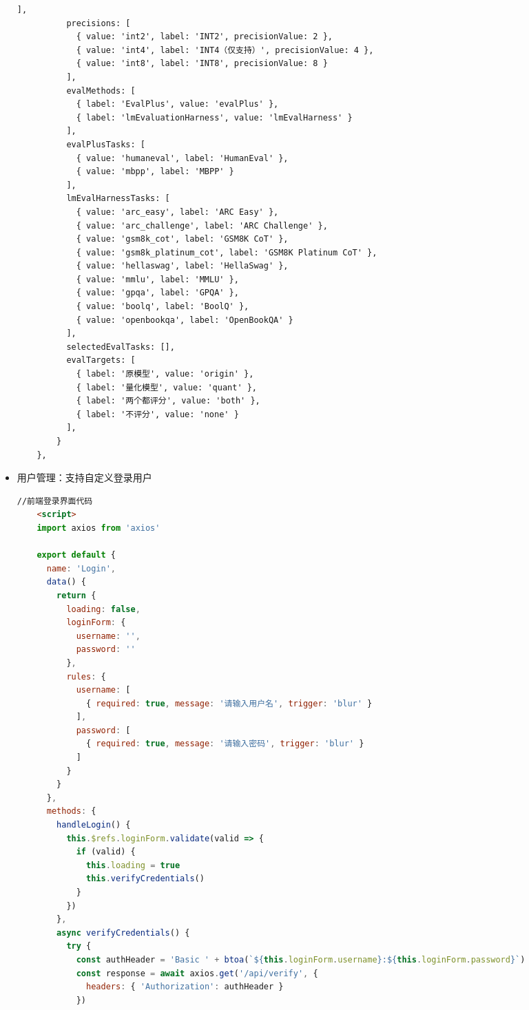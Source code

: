 \documentclass[AutoFakeBold,AutoFakeSlant,language=chinese,degree=bachelor]{sustechthesis}
\begin{document}
\begin{itemize}
\begin{lstlisting}[language=HTML]
          ],
          precisions: [
            { value: 'int2', label: 'INT2', precisionValue: 2 },
            { value: 'int4', label: 'INT4（仅支持）', precisionValue: 4 },
            { value: 'int8', label: 'INT8', precisionValue: 8 }
          ],
          evalMethods: [
            { label: 'EvalPlus', value: 'evalPlus' },
            { label: 'lmEvaluationHarness', value: 'lmEvalHarness' }
          ],
          evalPlusTasks: [
            { value: 'humaneval', label: 'HumanEval' },
            { value: 'mbpp', label: 'MBPP' }
          ],
          lmEvalHarnessTasks: [
            { value: 'arc_easy', label: 'ARC Easy' },
            { value: 'arc_challenge', label: 'ARC Challenge' },
            { value: 'gsm8k_cot', label: 'GSM8K CoT' },
            { value: 'gsm8k_platinum_cot', label: 'GSM8K Platinum CoT' },
            { value: 'hellaswag', label: 'HellaSwag' },
            { value: 'mmlu', label: 'MMLU' },
            { value: 'gpqa', label: 'GPQA' },
            { value: 'boolq', label: 'BoolQ' },
            { value: 'openbookqa', label: 'OpenBookQA' }
          ],
          selectedEvalTasks: [],
          evalTargets: [
            { label: '原模型', value: 'origin' },
            { label: '量化模型', value: 'quant' },
            { label: '两个都评分', value: 'both' },
            { label: '不评分', value: 'none' }
          ],
        }
    },
        \end{lstlisting}
        
    \item 用户管理：支持自定义登录用户
    \begin{lstlisting}[language=HTML]
    //前端登录界面代码
    <script>
    import axios from 'axios'
    
    export default {
      name: 'Login',
      data() {
        return {
          loading: false,
          loginForm: {
            username: '',
            password: ''
          },
          rules: {
            username: [
              { required: true, message: '请输入用户名', trigger: 'blur' }
            ],
            password: [
              { required: true, message: '请输入密码', trigger: 'blur' }
            ]
          }
        }
      },
      methods: {
        handleLogin() {
          this.$refs.loginForm.validate(valid => {
            if (valid) {
              this.loading = true
              this.verifyCredentials()
            }
          })
        },
        async verifyCredentials() {
          try {
            const authHeader = 'Basic ' + btoa(`${this.loginForm.username}:${this.loginForm.password}`)
            const response = await axios.get('/api/verify', {
              headers: { 'Authorization': authHeader }
            })
    

\end{lstlisting}
\end{itemize}
\end{document}
